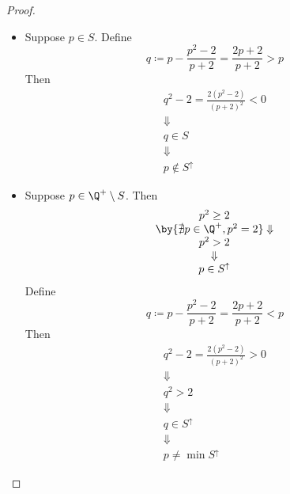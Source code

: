 \begin{proof}
  \leavevmode\par
  \begin{itemize}
    \item Suppose $p \in S$. Define
          \[
            q \coloneqq p - \frac{p^{2} - 2}{p + 2} = \frac{2p + 2}{p + 2} > p
          \]
          Then
          \[
            \begin{array}{c}
              q^{2} - 2 = \frac{2(p^{2} - 2)}{(p + 2)^{2}} < 0 \\
              \Downarrow                                       \\
              q \in S                                          \\
              \Downarrow                                       \\
              p \notin S^{\uparrow}
            \end{array}
          \]
    \item Suppose $p \in \Q^{+} \setminus S$. Then
          \[
            \begin{array}{c}
              p^{2} \geq 2                                                  \\
              \by{\ensuremath{\nexists p \in \Q^{+}, p^{2} = 2}} \Downarrow \\
              p^{2} > 2                                                     \\
              \Downarrow                                                    \\
              p \in S^{\uparrow}
            \end{array}
          \]
          Define
          \[
            q \coloneqq p - \frac{p^{2} - 2}{p + 2} = \frac{2p + 2}{p + 2} < p
          \]
          Then
          \[
            \begin{array}{c}
              q^{2} - 2 = \frac{2(p^{2} - 2)}{(p + 2)^{2}} > 0 \\
              \Downarrow                                       \\
              q^{2} > 2                                        \\
              \Downarrow                                       \\
              q \in S^{\uparrow}                               \\
              \Downarrow                                       \\
              p \neq \min S^{\uparrow}
            \end{array}
          \]
  \end{itemize}
\end{proof}

